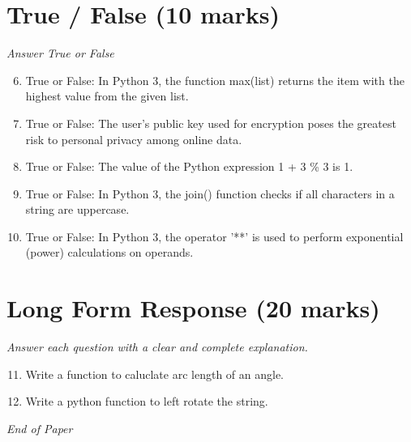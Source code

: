 \documentclass[12pt]{article}
\begin{document}
\section*{True / False (10 marks)}
\textit{Answer True or False}
\begin{enumerate}[label=\arabic*.]
\setcounter{enumi}{5}
\item True or False: In Python 3, the function max(list) returns the item with the highest value from the given list.
\item True or False: The user's public key used for encryption poses the greatest risk to personal privacy among online data.
\item True or False: The value of the Python expression 1 + 3 \% 3 is 1.
\item True or False: In Python 3, the join() function checks if all characters in a string are uppercase.
\item True or False: In Python 3, the operator '**' is used to perform exponential (power) calculations on operands.
\end{enumerate}

\section*{Long Form Response (20 marks)}
\textit{Answer each question with a clear and complete explanation.}
\begin{enumerate}[label=\arabic*.]
\setcounter{enumi}{10}
\item Write a function to caluclate arc length of an angle.
\item Write a python function to left rotate the string.
\end{enumerate}

\vfill
\noindent\textit{End of Paper}
\end{document}
